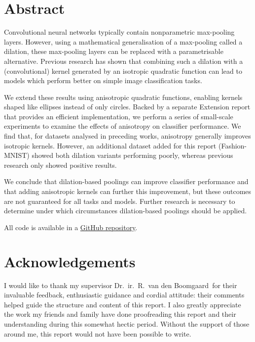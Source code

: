 \documentclass[a4paper, 12pt]{report}
\newcommand{\theSupervisor}{Dr.\ ir.\ R.\ van den Boomgaard} %
\begin{document}
\newpage



\setcounter{page}{1}
\pagestyle{plain} 


\section*{Abstract}
Convolutional neural networks typically contain nonparametric max-pooling layers. However, using a mathematical generalisation of a max-pooling called a dilation, these max-pooling layers can be replaced with a parametrisable alternative. Previous research has shown that combining such a dilation with a (convolutional) kernel generated by an isotropic quadratic function can lead to models which perform better on simple image classification tasks. 

We extend these results using anisotropic quadratic functions, enabling kernels shaped like ellipses instead of only circles. Backed by a separate Extension report that provides an efficient implementation, we perform a series of small-scale experiments to examine the effects of anisotropy on classifier performance. We find that, for datasets analysed in preceding works, anisotropy generally improves isotropic kernels. However, an additional dataset added for this report (Fashion-MNIST) showed both dilation variants performing poorly, whereas previous research only showed positive results. 

We conclude that dilation-based poolings can improve classifier performance and that adding anisotropic kernels can further this improvement, but these outcomes are not guaranteed for all tasks and models. Further research is necessary to determine under which circumstances dilation-based poolings should be applied.

All code is available in a \href{https://github.com/p-adema/quadratic-conv}{\color{cyan}GitHub repository}.

\vfill
\section*{Acknowledgements}
I would like to thank my supervisor \theSupervisor\ for their invaluable feedback, enthusiastic guidance and cordial attitude: their comments helped guide the structure and content of this report. I also greatly appreciate the work my friends and family have done proofreading this report and their understanding during this somewhat hectic period. Without the support of those around me, this report would not have been possible to write.
\end{document}
